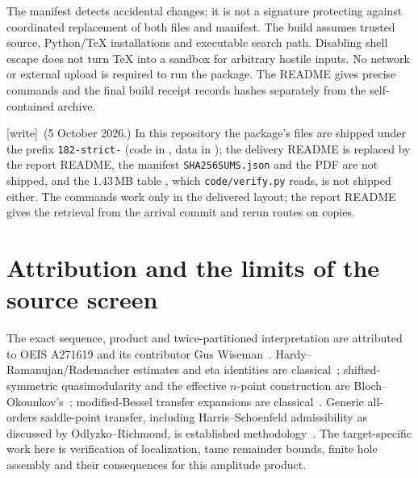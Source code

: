 \documentclass[11pt]{article}
\theoremstyle{remark}\newtheorem{remark}[theorem]{Remark}
\newcommand{\wtag}{\textup{[write]}}
\begin{document}
The manifest detects accidental changes; it is not a signature protecting against coordinated replacement of both files and manifest. The build assumes trusted source, Python/TeX installations and executable search path. Disabling shell escape does not turn TeX into a sandbox for arbitrary hostile inputs. No network or external upload is required to run the package. The README gives precise commands and the final build receipt records hashes separately from the self-contained archive.

\wtag\ (5 October 2026.) In this repository the package's files are shipped
under the prefix \texttt{182-strict-} (code in , data in
); the delivery README is replaced by the report README, the
manifest \texttt{SHA256SUMS.json} and the PDF are not shipped, and the
1.43\,MB table , which
\texttt{code/verify.py} reads, is not shipped either. The commands work only
in the delivered layout; the report README gives the retrieval from the
arrival commit and rerun routes on copies.

\section{Attribution and the limits of the source screen}
\label{stp:sum:sec:sources}
The exact sequence, product and twice-partitioned interpretation are attributed to OEIS A271619 and its contributor Gus Wiseman~\cite{oeis}. Hardy--Ramanujan/Rademacher estimates and eta identities are classical~\cite{dlmfpart}; shifted-symmetric quasimodularity and the effective $n$-point construction are Bloch--Okounkov's~\cite{BO}; modified-Bessel transfer expansions are classical~\cite{dlmfbessel}. Generic all-orders saddle-point transfer, including Harris--Schoenfeld admissibility as discussed by Odlyzko--Richmond, is established methodology~\cite{OR}. The target-specific work here is verification of localization, tame remainder bounds, finite hole assembly and their consequences for this amplitude product.
\end{document}
